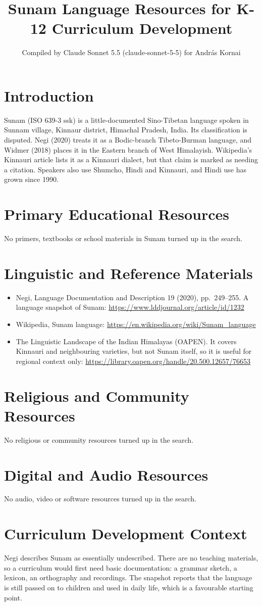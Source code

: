 \documentclass[12pt]{article}
\title{Sunam Language Resources for K-12 Curriculum Development}
\author{Compiled by Claude Sonnet 5.5 (claude-sonnet-5-5) for Andr\'as Kornai}
\date{}
\begin{document}
\maketitle

\section{Introduction}
Sunam (ISO 639-3 ssk) is a little-documented Sino-Tibetan language spoken in Sunnam village, Kinnaur district, Himachal Pradesh, India. Its classification is disputed. Negi (2020) treats it as a Bodic-branch Tibeto-Burman language, and Widmer (2018) places it in the Eastern branch of West Himalayish. Wikipedia's Kinnauri article lists it as a Kinnauri dialect, but that claim is marked as needing a citation. Speakers also use Shumcho, Hindi and Kinnauri, and Hindi use has grown since 1990.

\section{Primary Educational Resources}
No primers, textbooks or school materials in Sunam turned up in the search.

\section{Linguistic and Reference Materials}
\begin{itemize}
\item Negi, Language Documentation and Description 19 (2020), pp.\ 249--255. A language snapshot of Sunam: \url{https://www.lddjournal.org/article/id/1232}
\item Wikipedia, Sunam language: \url{https://en.wikipedia.org/wiki/Sunam_language}
\item The Linguistic Landscape of the Indian Himalayas (OAPEN). It covers Kinnauri and neighbouring varieties, but not Sunam itself, so it is useful for regional context only: \url{https://library.oapen.org/handle/20.500.12657/76653}
\end{itemize}

\section{Religious and Community Resources}
No religious or community resources turned up in the search.

\section{Digital and Audio Resources}
No audio, video or software resources turned up in the search.

\section{Curriculum Development Context}
Negi describes Sunam as essentially undescribed. There are no teaching materials, so a curriculum would first need basic documentation: a grammar sketch, a lexicon, an orthography and recordings. The snapshot reports that the language is still passed on to children and used in daily life, which is a favourable starting point.
\end{document}

